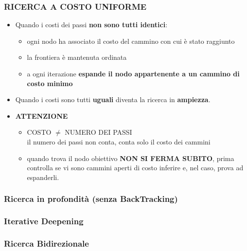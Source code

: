 \documentclass[14pt]{extarticle}
\begin{document}
\subsubsection{RICERCA A COSTO UNIFORME}
\begin{itemize}
    \item Quando i costi dei passi \textbf{non sono tutti identici}:
        \begin{itemize}
            \item ogni nodo ha associato il costo del cammino con cui è stato raggiunto
            \item la frontiera è mantenuta ordinata
            \item a ogni iterazione \textbf{espande il nodo appartenente a un cammino di costo minimo}
        \end{itemize}
    \item Quando i costi sono tutti \textbf{uguali} diventa la ricerca in \textbf{ampiezza}.
    \item \textbf{ATTENZIONE}
    \begin{itemize}
        \item COSTO $\neq$ NUMERO DEI PASSI\\il numero dei passi non conta, conta solo il costo dei cammini
        \item quando trova il nodo obiettivo \textbf{NON SI FERMA SUBITO}, prima controlla se vi sono cammini aperti di costo inferire e, nel caso, prova ad espanderli.
    \end{itemize}
\end{itemize}
\subsubsection{Ricerca in profondità (senza BackTracking)}
\subsubsection{Iterative Deepening}
\subsubsection{Ricerca Bidirezionale}

\newpage
\end{document}
